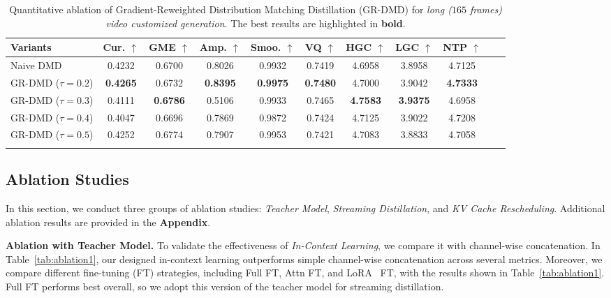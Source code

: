 \documentclass{llmxive}
\begin{document}
\begin{table}[!t]
\centering
\setlength{\tabcolsep}{2.5pt}
\begin{tabular}{l c ccccccccc}
\toprule
Variants & Cur. $\uparrow$ & GME $\uparrow$ & Amp. $\uparrow$ & Smoo. $\uparrow$ & VQ $\uparrow$ & HGC $\uparrow$ & LGC $\uparrow$ & NTP $\uparrow$ \\
\midrule
Naive DMD           & 0.4232 & 0.6700 & 0.8026 & 0.9932 & 0.7419 & 4.6958 & 3.8958 & 4.7125  \\
\rowcolor{gray!25}
GR-DMD ($\tau=0.2$) & \textbf{0.4265} & 0.6732 & \textbf{0.8395} & \textbf{0.9975} & \textbf{0.7480} & 4.7000 & 3.9042 & \textbf{4.7333}  \\
GR-DMD ($\tau=0.3$) & 0.4111 & \textbf{0.6786} & 0.5106 & 0.9933 & 0.7465 & \textbf{4.7583} & \textbf{3.9375} & 4.6958  \\
GR-DMD ($\tau=0.4$) & 0.4047 & 0.6696 & 0.7869 & 0.9872 & 0.7424 & 4.7125 & 3.9022 & 4.7208  \\
GR-DMD ($\tau=0.5$) & 0.4252 & 0.6774 & 0.7907 & 0.9953 & 0.7421 & 4.7083 & 3.8833 & 4.7058  \\
\bottomrule
\label{tab:ablation2}
\vspace{-1.0em}
\end{tabular}
\caption{
Quantitative ablation of Gradient-Reweighted Distribution Matching Distillation (GR-DMD) for \textit{long ($165$ frames) video customized generation}. The best results are highlighted in \textbf{bold}.
}
\end{table}



\subsection{Ablation Studies}
%
In this section, we conduct three groups of ablation studies: \textit{Teacher Model}, \textit{Streaming Distillation}, and \textit{KV Cache Rescheduling}.
% 
Additional ablation results are provided in the \textbf{Appendix}.



\noindent
\textbf{Ablation with Teacher Model.}
% 
To validate the effectiveness of \textit{In-Context Learning}, we compare it with channel-wise concatenation.
In Table~\ref{tab:ablation1}, our designed in-context learning outperforms simple channel-wise concatenation across several metrics.
% 
Moreover, we compare different fine-tuning (FT) strategies, including Full FT, Attn FT, and LoRA~\cite{hu2022lora} FT, with the results shown in Table~\ref{tab:ablation1}.
% 
Full FT performs best overall, so we adopt this version of the teacher model for streaming distillation.
\end{document}
